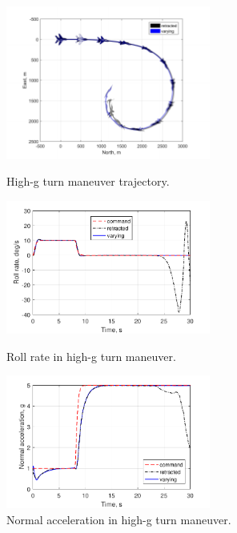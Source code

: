 \documentclass[a4paper, 12pt]{report}
\begin{document}
	\begin{figure}[!h]
		\centering
		\includegraphics[width=0.6\textwidth]{./resources/pdf/highgturn_trj.pdf}
		\caption{High-g turn maneuver trajectory.}
		\label{fig:highgturn_trj}
		\centering
		\includegraphics[width=0.6\textwidth]{./resources/pdf/highgturn1.pdf}
		\caption{Roll rate in high-g turn maneuver.}
		\label{fig:highgturn1}
		\centering
		\includegraphics[width=0.6\textwidth]{./resources/pdf/highgturn2.pdf}
		\caption{Normal acceleration in high-g turn maneuver.}
		\label{fig:highgturn2}
	\end{figure}
\end{document}
